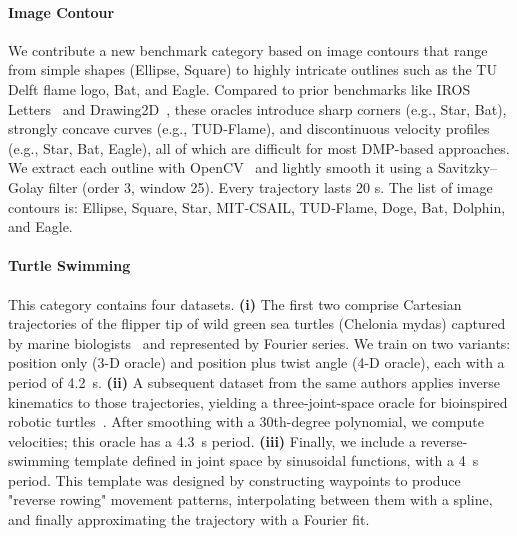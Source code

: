\paragraph{Image Contour}
% 
We contribute a new benchmark category based on image contours that range from simple shapes (Ellipse, Square) to highly intricate outlines such as the TU Delft flame logo, Bat, and Eagle. Compared to prior benchmarks like IROS Letters~\citep{urain2020imitationflow} and Drawing2D~\citep{nawaz2024learning}, these oracles introduce sharp corners (e.g., Star, Bat), strongly concave curves (e.g., TUD‐Flame), and discontinuous velocity profiles (e.g., Star, Bat, Eagle), all of which are difficult for most DMP-based approaches.
We extract each outline with OpenCV~\citep{bradski2000opencv} and lightly smooth it using a Savitzky–Golay filter (order 3, window 25). Every trajectory lasts 20 s.
% 
The list of image contours is: Ellipse, Square, Star, MIT‐CSAIL, TUD‐Flame, Doge, Bat, Dolphin, and Eagle. 

\paragraph{Turtle Swimming}
This category contains four datasets.
\textbf{(i)} The first two comprise Cartesian trajectories of the flipper tip of wild green sea turtles (Chelonia mydas) captured by marine biologists~\citep{van2022new} and represented by Fourier series. We train on two variants: position only (3-D oracle) and position plus twist angle (4-D oracle), each with a period of \SI{4.2}{s}.
\textbf{(ii)} A subsequent dataset from the same authors applies inverse kinematics to those trajectories, yielding a three-joint-space oracle for bioinspired robotic turtles~\citep{van2023soft}. After smoothing with a 30th-degree polynomial, we compute velocities; this oracle has a \SI{4.3}{s} period.
\textbf{(iii)} Finally, we include a reverse-swimming template defined in joint space by sinusoidal functions, with a \SI{4}{s} period. This template was designed by constructing waypoints to produce "reverse rowing" movement patterns, interpolating between them with a spline, and finally approximating the trajectory with a Fourier fit.

